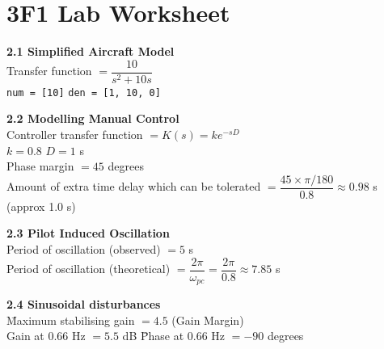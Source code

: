 \documentclass[fleqn,12pt,a4paper,twoside]{article}
\begin{document}
\pagebreak

\section*{3F1 Lab Worksheet}

\begin{tabbing}
        \textbf{2.1 Simplified Aircraft Model} \\
        Transfer function $= \dfrac{10}{s^2 + 10s}$ \\
        \verb+num = [10]+ \hspace*{2cm} \verb+den = [1, 10, 0]+\\
\end{tabbing}

\begin{tabbing}
        \textbf{2.2 Modelling Manual Control}\\
        Controller transfer function $= K(s) = k e^{-sD}$\\
        $k= 0.8$ \hspace*{2cm} $D= 1$ s\\

        Phase margin $= 45$ degrees\\

        Amount of extra time delay which can be tolerated $= \dfrac{45 \times \pi/180}{0.8} \approx 0.98$ s (approx 1.0 s)\\
\end{tabbing}

\begin{tabbing}
        \textbf{2.3 Pilot Induced Oscillation}\\

        Period of oscillation (observed) $= 5$ s\\

        Period of oscillation (theoretical) $= \dfrac{2\pi}{\omega_{pc}} = \dfrac{2\pi}{0.8} \approx 7.85$ s\\
\end{tabbing}

\begin{tabbing}
        \textbf{2.4 Sinusoidal disturbances}\\
        \= Maximum stabilising gain $= 4.5$ (Gain Margin)\\
        \> Gain at 0.66 Hz $= 5.5$ dB \hspace*{2cm} \= Phase at 0.66 Hz $= -90$ degrees\\
\end{tabbing}
\end{document}

